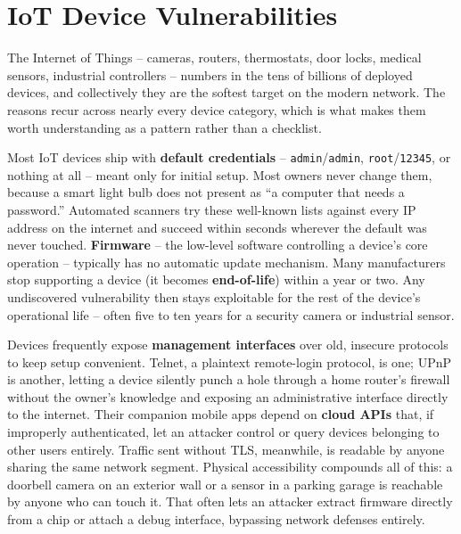 \section{IoT Device Vulnerabilities}

The Internet of Things -- cameras, routers, thermostats, door locks, medical sensors, industrial
controllers -- numbers in the tens of billions of deployed devices, and collectively they are the
softest target on the modern network. The reasons recur across nearly every device category, which
is what makes them worth understanding as a pattern rather than a checklist.

Most IoT devices ship with \textbf{default credentials} -- \texttt{admin}/\texttt{admin},
\texttt{root}/\texttt{12345}, or nothing at all -- meant only for initial setup. Most owners never
change them, because a smart light bulb does not present as ``a computer that needs a password.''
Automated scanners try these well-known lists against every IP address on the internet and succeed
within seconds wherever the default was never touched. \textbf{Firmware} -- the low-level software
controlling a device's core operation -- typically has no automatic update mechanism. Many
manufacturers stop supporting a device (it becomes \textbf{end-of-life}) within a year or two. Any
undiscovered vulnerability then stays exploitable for the rest of the device's operational life --
often five to ten years for a security camera or industrial sensor.

Devices frequently expose \textbf{management interfaces} over old, insecure protocols to keep
setup convenient. Telnet, a plaintext remote-login protocol, is one; UPnP is another, letting a
device silently punch a hole through a home router's firewall without the owner's knowledge and
exposing an administrative interface directly to the internet. Their companion mobile apps depend
on \textbf{cloud APIs} that, if improperly authenticated, let an attacker control or query devices
belonging to other users entirely. Traffic sent without TLS, meanwhile, is readable by anyone
sharing the same network segment. Physical accessibility compounds all of this: a doorbell camera
on an exterior wall or a sensor in a parking garage is reachable by anyone who can touch it. That
often lets an attacker extract firmware directly from a chip or attach a debug interface,
bypassing network defenses entirely.

